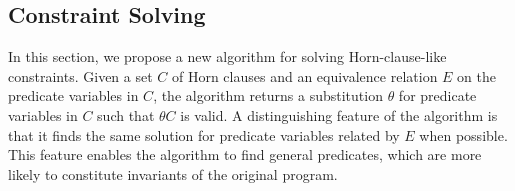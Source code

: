 


\subsection{Constraint Solving}
\label{sec:cs}

In this section, we propose a new algorithm for solving Horn-clause-like 
constraints.  Given a set \(C\) of Horn clauses and an equivalence 
relation \(E\) on the predicate variables in \(C\), the algorithm 
returns a substitution \(\theta\) for predicate variables in \(C\) such 
that \(\theta C\) is valid.  A distinguishing feature of the algorithm 
is that it finds the same solution for predicate variables related by 
\(E\) when possible.  This feature enables the algorithm to find general 
predicates, which are more likely to constitute invariants of the 
original program.

